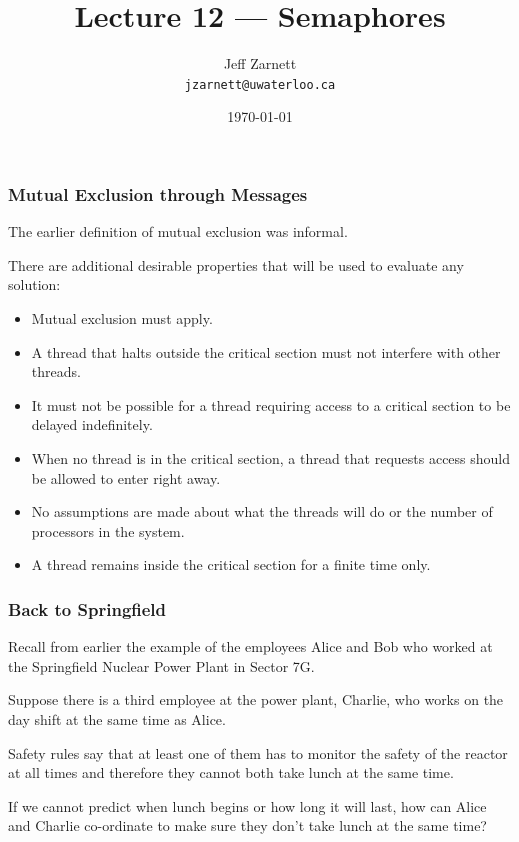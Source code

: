 

\title{Lecture 12 --- Semaphores }

\author{Jeff Zarnett \\ \small \texttt{jzarnett@uwaterloo.ca}}
\date{\today}




\begin{frame}
  \titlepage

 \end{frame}

\begin{frame}
\frametitle{Mutual Exclusion through Messages}

The earlier definition of mutual exclusion was informal.

There are additional desirable properties that will be used to evaluate any solution:
\begin{itemize}
	\item Mutual exclusion must apply.
	\item A thread that halts outside the critical section must not interfere with other threads.
	\item It must not be possible for a thread requiring access to a critical section to be delayed indefinitely.
	\item When no thread is in the critical section, a thread that requests access should be allowed to enter right away.
	\item No assumptions are made about what the threads will do or the number of processors in the system.
	\item A thread remains inside the critical section for a finite time only.
\end{itemize}


\end{frame}

\begin{frame}
\frametitle{Back to Springfield}
Recall from earlier the example of the employees Alice and Bob who worked at the Springfield Nuclear Power Plant in Sector 7G.  

Suppose there is a third employee at the power plant, Charlie, who works on the day shift at the same time as Alice. 

Safety rules say that at least one of them has to monitor the safety of the reactor at all times and therefore they cannot both take lunch at the same time. 

If we cannot predict when lunch begins or how long it will last, how can Alice and Charlie co-ordinate to make sure they don't take lunch at the same time?

\end{frame}

